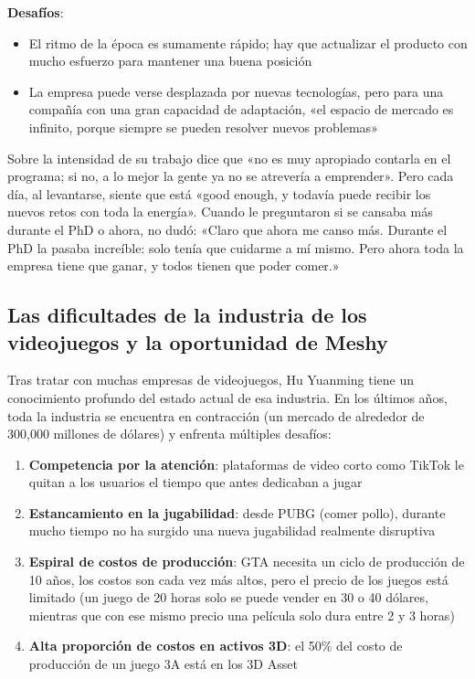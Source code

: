 \textbf{Desafíos}:
\begin{itemize}
\item El ritmo de la época es sumamente rápido; hay que actualizar el producto con mucho esfuerzo para mantener una buena posición
\item La empresa puede verse desplazada por nuevas tecnologías, pero para una compañía con una gran capacidad de adaptación, «el espacio de mercado es infinito, porque siempre se pueden resolver nuevos problemas»
\end{itemize}

Sobre la intensidad de su trabajo dice que «no es muy apropiado contarla en el programa; si no, a lo mejor la gente ya no se atrevería a emprender». Pero cada día, al levantarse, siente que está «good enough, y todavía puede recibir los nuevos retos con toda la energía». Cuando le preguntaron si se cansaba más durante el PhD o ahora, no dudó: «Claro que ahora me canso más. Durante el PhD la pasaba increíble: solo tenía que cuidarme a mí mismo. Pero ahora toda la empresa tiene que ganar, y todos tienen que poder comer.»

\subsection{Las dificultades de la industria de los videojuegos y la oportunidad de Meshy}

Tras tratar con muchas empresas de videojuegos, Hu Yuanming tiene un conocimiento profundo del estado actual de esa industria. En los últimos años, toda la industria se encuentra en contracción (un mercado de alrededor de 300,000 millones de dólares) y enfrenta múltiples desafíos:

\begin{enumerate}
\item \textbf{Competencia por la atención}: plataformas de video corto como TikTok le quitan a los usuarios el tiempo que antes dedicaban a jugar
\item \textbf{Estancamiento en la jugabilidad}: desde PUBG (comer pollo), durante mucho tiempo no ha surgido una nueva jugabilidad realmente disruptiva
\item \textbf{Espiral de costos de producción}: GTA necesita un ciclo de producción de 10 años, los costos son cada vez más altos, pero el precio de los juegos está limitado (un juego de 20 horas solo se puede vender en 30 o 40 dólares, mientras que con ese mismo precio una película solo dura entre 2 y 3 horas)
\item \textbf{Alta proporción de costos en activos 3D}: el 50\% del costo de producción de un juego 3A está en los 3D Asset
\end{enumerate}

